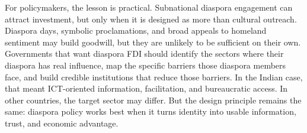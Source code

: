 \documentclass[doublespace,nopageskip]{UVAthesis}
\begin{document}
For policymakers, the lesson is practical. Subnational diaspora engagement can attract investment, but only when it is designed as more than cultural outreach. Diaspora days, symbolic proclamations, and broad appeals to homeland sentiment may build goodwill, but they are unlikely to be sufficient on their own. Governments that want diaspora FDI should identify the sectors where their diaspora has real influence, map the specific barriers those diaspora members face, and build credible institutions that reduce those barriers. In the Indian case, that meant ICT-oriented information, facilitation, and bureaucratic access. In other countries, the target sector may differ. But the design principle remains the same: diaspora policy works best when it turns identity into usable information, trust, and economic advantage.

	\printbibliography[heading=bibintoc]
	   

	\appendix

	\appendix
\end{document}
